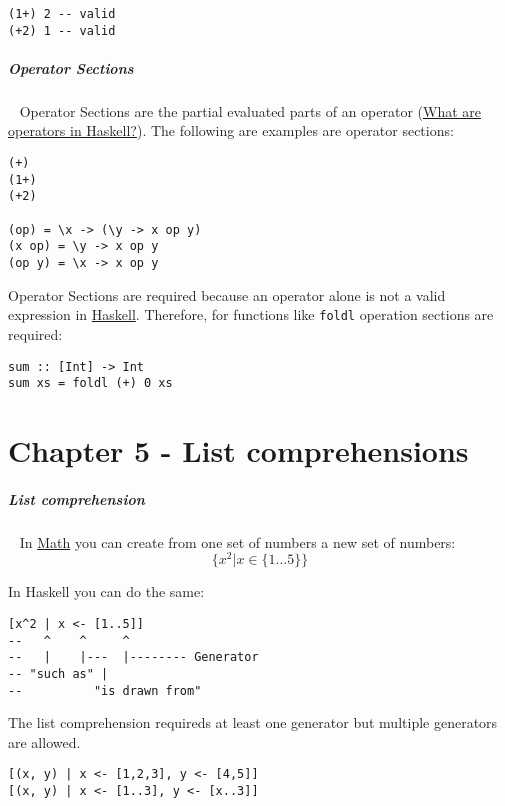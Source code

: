\documentclass[11pt,twoside,landscape]{article}
\begin{document}
\begin{multicols}{3}
\begin{lstlisting}
(1+) 2 -- valid
(+2) 1 -- valid
\end{lstlisting}

\subparagraph{Operator Sections} \
\label{sec:org388025c}
Operator Sections are the partial evaluated parts of an operator (\href{../../../roam/20220221074036-what_are_operators_in_haskell.org}{What are operators in Haskell?}).
The following are examples are operator sections:

\lstset{language=haskell,label= ,caption= ,captionpos=b,numbers=none}
\begin{lstlisting}
(+)
(1+)
(+2)

(op) = \x -> (\y -> x op y)
(x op) = \y -> x op y
(op y) = \x -> x op y
\end{lstlisting}

Operator Sections are required because an operator alone is not a valid expression in \href{../../../roam/20210618182407-haskell.org}{Haskell}.
Therefore, for functions like \texttt{foldl} operation sections are required:

\lstset{language=haskell,label= ,caption= ,captionpos=b,numbers=none}
\begin{lstlisting}
sum :: [Int] -> Int
sum xs = foldl (+) 0 xs
\end{lstlisting}

\section{Chapter 5 - List comprehensions}
\label{sec:orgdc9ddde}
\subparagraph{List comprehension} \
\label{sec:org35beee9}
In \href{../../../roam/20200914131723-math.org}{Math} you can create from one set of numbers a new set of numbers:
\begin{equation}
\{ x^2 | x \in \{1 \ldots 5 \} \}
\end{equation}

In Haskell you can do the same:

\lstset{language=haskell,label= ,caption= ,captionpos=b,numbers=none}
\begin{lstlisting}
[x^2 | x <- [1..5]]
--   ^    ^     ^ 
--   |    |---  |-------- Generator
-- "such as" |
--          "is drawn from"
\end{lstlisting}

The list comprehension requireds at least one generator but multiple generators are allowed.

\lstset{language=haskell,label= ,caption= ,captionpos=b,numbers=none}
\begin{lstlisting}
[(x, y) | x <- [1,2,3], y <- [4,5]]
[(x, y) | x <- [1..3], y <- [x..3]]
\end{lstlisting}


\end{multicols}
\end{document}
